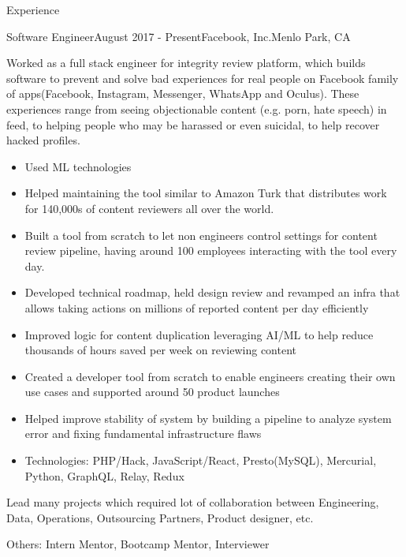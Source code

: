 \documentclass{resume} %
\begin{document}
\center


\begin{rSection}{Experience}
\begin{rSubsection}{Software Engineer}{August 2017 - Present}{Facebook, Inc.}{Menlo Park, CA}
\item Worked as a full stack engineer for integrity review platform, which builds software to prevent and solve bad experiences for real people on Facebook family of apps(Facebook, Instagram, Messenger, WhatsApp and Oculus). These experiences range from seeing objectionable content (e.g. porn, hate speech) in feed, to helping people who may be harassed or even suicidal, to help recover hacked profiles.
\begin{itemize}
\item Used ML technologies 
\item Helped maintaining the tool similar to Amazon Turk that distributes work for 140,000s of content reviewers all over the world.
\item Built a tool from scratch to let non engineers control settings for content review pipeline, having around 100 employees interacting with the tool every day.
\item Developed technical roadmap, held design review and revamped an infra that allows taking actions on millions of reported content per day efficiently
\item Improved logic for content duplication leveraging AI/ML to help reduce thousands of hours saved per week on reviewing content
\item Created a developer tool from scratch to enable engineers creating their own use cases and supported around 50 product launches
\item Helped improve stability of system by building a pipeline to analyze system error and fixing fundamental infrastructure flaws
\item Technologies: PHP/Hack, JavaScript/React, Presto(MySQL), Mercurial, Python, GraphQL, Relay, Redux
\end{itemize}
\item Lead many projects which required lot of collaboration between Engineering, Data, Operations, Outsourcing Partners, Product designer, etc.
\item Others: Intern Mentor, Bootcamp Mentor, Interviewer


\end{rSubsection}
\end{rSection}
\end{document}
